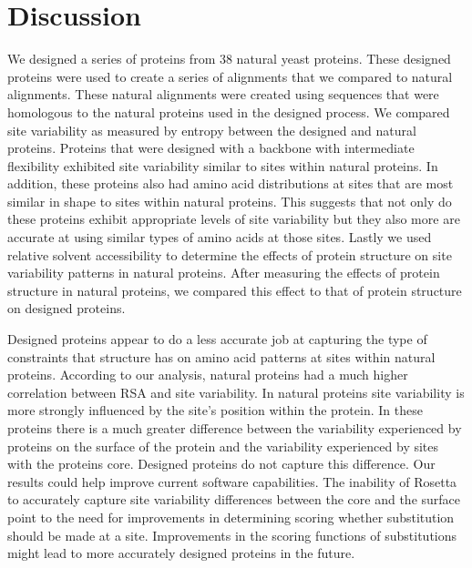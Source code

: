 \documentclass[12pt]{article}
\begin{document}
\section{Discussion}

{\color{blue}
We designed a series of proteins from 38 natural yeast proteins. These designed proteins were used to create a series of alignments that we compared to natural alignments. These natural alignments were created using sequences that were homologous to the natural proteins used in the designed process.  We compared site variability as measured by entropy between the designed and natural proteins. Proteins that were designed with a backbone with intermediate flexibility exhibited site variability similar to sites within natural proteins. In addition, these proteins also had amino acid distributions at sites that are most similar in shape to sites within natural proteins. This suggests that not only do these proteins exhibit appropriate levels of site variability but they also more are accurate at using similar types of amino acids at those sites.  Lastly we used relative solvent accessibility to determine the effects of protein structure on site variability patterns in natural proteins. After measuring the effects of protein structure in natural proteins, we compared this effect to that of protein structure on designed proteins. 

Designed proteins appear to do a less accurate job at capturing the type of constraints that structure has on amino acid patterns at sites within natural proteins. According to our analysis, natural proteins had a much higher correlation between RSA and site variability. In natural proteins site variability is more strongly influenced by the site's position within the protein. In these proteins there is a much greater difference between the variability experienced by proteins on the surface of the protein and the variability experienced by sites with the proteins core. Designed proteins do not capture this difference.  Our results could help improve current software capabilities. The inability of Rosetta to accurately capture site variability differences between the core and the surface point to the need for improvements in determining scoring whether substitution should be made at a site. Improvements in the scoring functions of substitutions might lead to more accurately designed proteins in the future.
}

\end{document}
